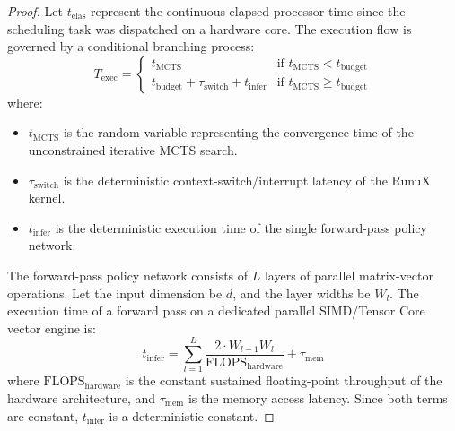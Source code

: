 \documentclass[11pt,a4paper]{book}
\begin{document}
\begin{proof}
Let $t_{\text{elas}}$ represent the continuous elapsed processor time since the scheduling task was dispatched on a hardware core. The execution flow is governed by a conditional branching process:
\begin{equation}
\label{eq:exec_flow}
T_{\text{exec}} = \begin{cases} t_{\text{MCTS}} & \text{if } t_{\text{MCTS}} < t_{\text{budget}} \\ t_{\text{budget}} + \tau_{\text{switch}} + t_{\text{infer}} & \text{if } t_{\text{MCTS}} \ge t_{\text{budget}} \end{cases}
\end{equation}
where:
\begin{itemize}
\item $t_{\text{MCTS}}$ is the random variable representing the convergence time of the unconstrained iterative MCTS search.
\item $\tau_{\text{switch}}$ is the deterministic context-switch/interrupt latency of the RunuX kernel.
\item $t_{\text{infer}}$ is the deterministic execution time of the single forward-pass policy network.
\end{itemize}

The forward-pass policy network consists of $L$ layers of parallel matrix-vector operations. Let the input dimension be $d$, and the layer widths be $W_l$. The execution time of a forward pass on a dedicated parallel SIMD/Tensor Core vector engine is:
\begin{equation}
\label{eq:inference_time}
t_{\text{infer}} = \sum_{l=1}^{L} \frac{2 \cdot W_{l-1} W_l}{\text{FLOPS}_{\text{hardware}}} + \tau_{\text{mem}}
\end{equation}
where $\text{FLOPS}_{\text{hardware}}$ is the constant sustained floating-point throughput of the hardware architecture, and $\tau_{\text{mem}}$ is the memory access latency. Since both terms are constant, $t_{\text{infer}} $ is a deterministic constant.


\end{proof}
\end{document}
